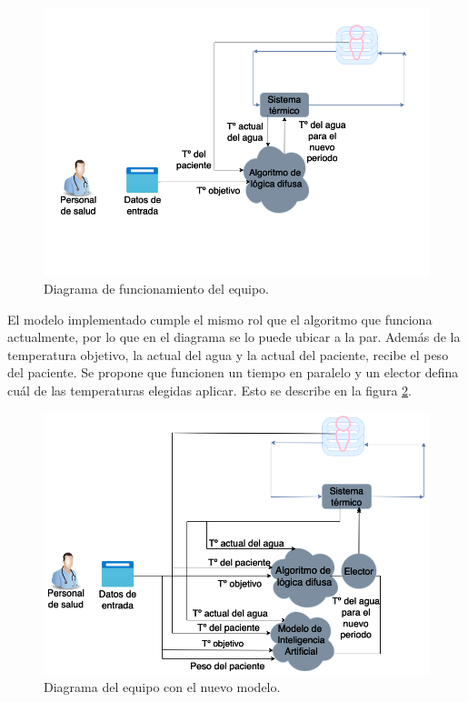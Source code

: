 \vspace{1cm}

\begin{figure}[htbp]
	\centering
	\includegraphics[width=1\textwidth]{./Figures/actual.png}
	\caption{Diagrama de funcionamiento del equipo.}
	\label{fig:actual-diagram}
\end{figure}

\vspace{1cm}

El modelo implementado cumple el mismo rol que el algoritmo que funciona actualmente, por lo que en el diagrama se lo puede ubicar a la par. Además de la temperatura objetivo, la actual del agua y la actual del paciente, recibe el peso del paciente. Se propone que funcionen un tiempo en paralelo y un elector defina cuál de las temperaturas elegidas aplicar. Esto se describe en la figura \ref{fig:model-diagram}. 

\vspace{1cm}

\begin{figure}[htbp]
	\centering
	\includegraphics[width=1\textwidth]{./Figures/modelo.png}
	\caption{Diagrama del equipo con el nuevo modelo.}
	\label{fig:model-diagram}
\end{figure}

